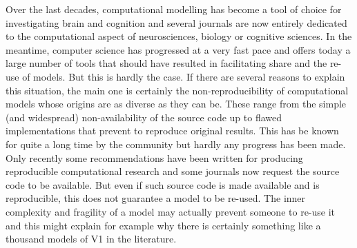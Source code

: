 \documentclass[jou]{apa6}
\begin{document}
Over the last decades, computational modelling has become a tool of choice for investigating brain and cognition and several journals are now entirely dedicated to the computational aspect of neurosciences, biology or cognitive sciences. In the meantime, computer science has progressed at a very fast pace and offers today a large number of tools that should have resulted in facilitating share and the re-use of models. But this is hardly the case. If there are several reasons to explain this situation, the main one is certainly the non-reproducibility of computational models whose origins are as diverse as they can be. These range from the simple (and widespread) non-availability of the source code up to flawed implementations that prevent to reproduce original results. This has be known for quite a long time by the community but hardly any progress has been made. Only recently some recommendations have been written for producing reproducible computational research and some journals now request the source code to be available. But even if such source code is made available and is reproducible, this does not guarantee a model to be re-used. The inner complexity and fragility of a model may actually prevent someone to re-use it and this might explain for example why there is certainly something like a thousand models of V1 in the literature.






\hspace*{1cm}
\end{document}
